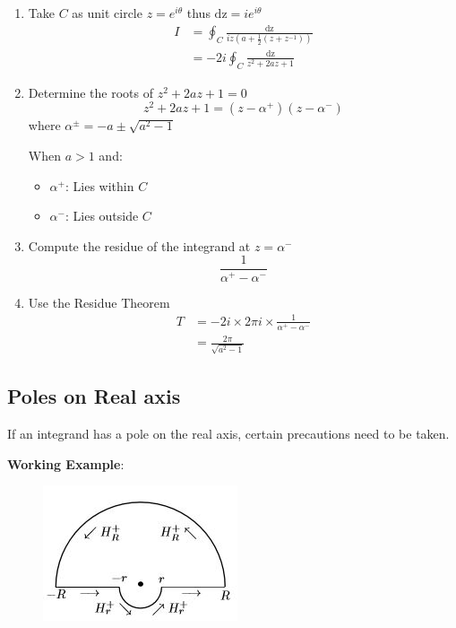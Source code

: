 \documentclass[10pt,a4paper]{article}
\begin{document}
\begin{enumerate}
    \item Take $C$ as unit circle $z=e^{i\theta}$ thus $\text{dz}=ie^{i\theta}$
    \begin{equation*} 
        \begin{aligned}
            I &= \oint_C \frac{\text{dz}}{iz(a+\frac{1}{2}(z+z^{-1}))} \\
            &= -2i \oint_C \frac{\text{dz}}{z^2 + 2az + 1}
        \end{aligned}
    \end{equation*}
    \item Determine the roots of $z^2 + 2az + 1 = 0$
    $$
    z^2 + 2az + 1 = (z-\alpha^+)(z-\alpha^-)
    $$
    where $\alpha^{\pm} = -a \pm \sqrt{a^2 - 1}$ \par 
    When $a>1$ and:
    \begin{itemize}
        \item $\alpha^+$: Lies within $C$
        \item $\alpha^-$: Lies outside $C$
    \end{itemize}
    \item Compute the residue of the integrand at $z=\alpha^-$
    $$
    \frac{1}{\alpha^+ - \alpha^-}
    $$
    \item Use the Residue Theorem
    \begin{equation*} 
        \begin{aligned}
            T &= -2i \times 2\pi i \times \frac{1}{\alpha^+ - \alpha^-} \\
            &= \frac{2 \pi}{\sqrt{a^2 - 1}}
        \end{aligned}
    \end{equation*}
\end{enumerate}


\subsection{Poles on Real axis}

If an integrand has a pole on the real axis, certain precautions need to be taken. \par 

\textbf{Working Example}: \par 

\begin{figure} [h!]
    \centering
    \includegraphics[]{Pole_real.JPG}
    
\end{figure}
\end{document}
